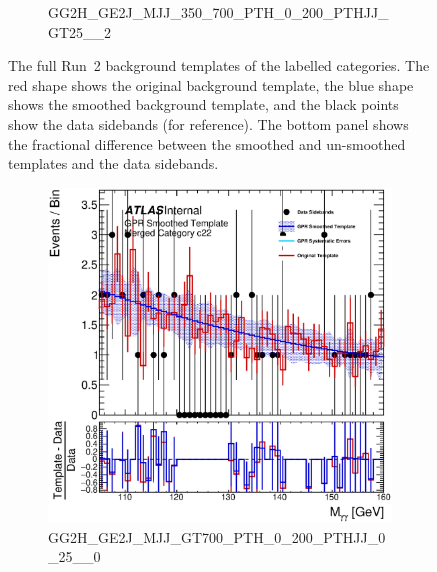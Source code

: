 \begin{figure}
\begin{center}
\begin{subfigure}[T]{0.49\linewidth}
	\caption{\tiny{GG2H\_GE2J\_MJJ\_350\_700\_PTH\_0\_200\_PTHJJ\_GT25\_\_2}}
\end{subfigure}
\caption{The full Run~2 background templates of the labelled categories. The red shape shows the original background template, the blue shape shows the smoothed background template, and the black points show the data sidebands (for reference). The bottom panel shows the fractional difference between the smoothed and un-smoothed templates and the data sidebands. }
 \label{fig:gpr_coupcat_5}
 \end{center}
\end{figure}

\begin{figure} 
\begin{center}
\begin{subfigure}[T]{0.49\linewidth}
	\centering
	\includegraphics[width=\linewidth]{figures/background/gpr/coupCatTemplates/GPR_Smoothed_Plot_hmgg_c22.eps}
	\caption{\tiny{GG2H\_GE2J\_MJJ\_GT700\_PTH\_0\_200\_PTHJJ\_0\_25\_\_0}}
\end{subfigure}
\begin{subfigure}[T]{0.49\linewidth}
	\centering

\end{subfigure}
\end{center}
\end{figure}
